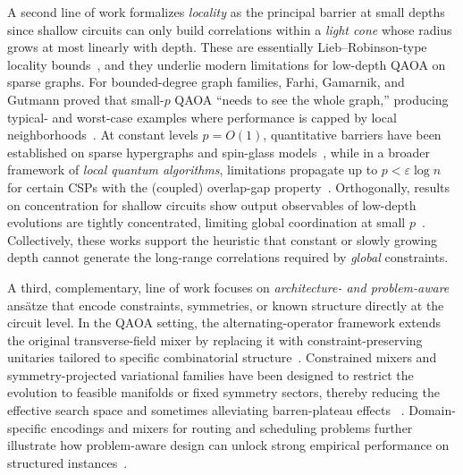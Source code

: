 \documentclass[a4paper,onecolumn,11pt,unpublished]{quantumarticle}
\theoremstyle{remark}
\begin{document}
A second line of work formalizes \emph{locality} as the principal barrier at small depths since shallow circuits can only build correlations within a \emph{light cone} whose radius grows at most linearly with depth. These are essentially Lieb--Robinson-type locality bounds~\cite{Hastings2010Locality}, and they underlie modern limitations for low-depth QAOA on sparse graphs. For bounded-degree graph families, Farhi, Gamarnik, and Gutmann proved that small-$p$ QAOA ``needs to see the whole graph,'' producing typical- and worst-case examples where performance is capped by local neighborhoods~\cite{FarhiGamarnikGutmann2020WholeGraph}. At constant levels $p=O(1)$, quantitative barriers have been established on sparse hypergraphs and spin-glass models~\cite{Basso2022}, while in a broader framework of \emph{local quantum algorithms}, limitations propagate up to $p<\varepsilon\log n$ for certain CSPs with the (coupled) overlap-gap property~\cite{GamarnikZadik2022QAOAOGP,Anschuetz_2024}. 
Orthogonally, results on concentration for shallow circuits show output observables of low-depth evolutions are tightly concentrated, limiting global coordination at small $p$~\cite{BravyiGossetKonig2018}. Collectively, these works support the heuristic that constant or slowly growing depth cannot generate the long-range correlations required by \emph{global} constraints.


A third, complementary, line of work focuses on \emph{architecture- and problem-aware}
ans\"atze that encode constraints, symmetries, or known structure directly at the
circuit level. In the QAOA setting, the alternating-operator framework extends the
original transverse-field mixer by replacing it with constraint-preserving unitaries
tailored to specific combinatorial structure~\cite{Hadfield2019AOA,HadfieldHoggRieffel2022}.
Constrained mixers and symmetry-projected variational families have been designed to
restrict the evolution to feasible manifolds or fixed symmetry sectors, thereby
reducing the effective search space and sometimes alleviating barren-plateau effects
~\cite{BaertschiEidenbenz2020,Fuchs2022ConstrainedMixers,Bravyi_2020}. Domain-specific encodings and mixers for routing and scheduling problems further illustrate how problem-aware design can unlock strong empirical performance on structured instances~\cite{Xie2024CVRP,tsvelikhovskiy2024symmetries}.
\end{document}
